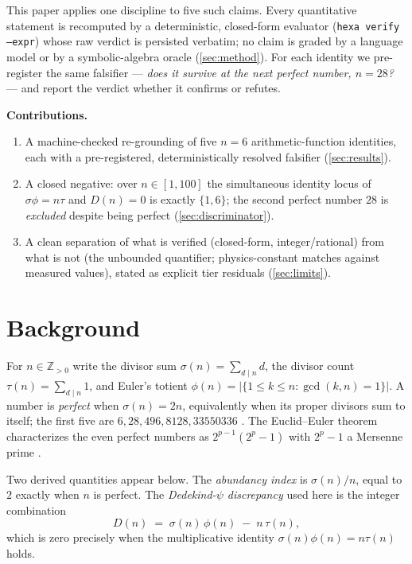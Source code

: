 \documentclass[11pt,a4paper]{article}
\newcommand{\sig}{\sigma}
\theoremstyle{definition}
\begin{document}
This paper applies one discipline to five such claims. Every quantitative
statement is recomputed by a deterministic, closed-form evaluator
(\texttt{hexa verify --expr}) whose raw verdict is persisted verbatim; no claim
is graded by a language model or by a symbolic-algebra oracle
(\textsection\ref{sec:method}). For each identity we pre-register the same
falsifier --- \emph{does it survive at the next perfect number, $n=28$?} --- and
report the verdict whether it confirms or refutes.

\medskip
\noindent\textbf{Contributions.}
\begin{enumerate}\itemsep0.3em
\item A machine-checked re-grounding of five $n=6$ arithmetic-function
identities, each with a pre-registered, deterministically resolved falsifier
(\textsection\ref{sec:results}).
\item A closed negative: over $n\in[1,100]$ the simultaneous identity locus of
$\sig\phi=n\tau$ and $D(n)=0$ is exactly $\{1,6\}$; the second perfect number
$28$ is \emph{excluded} despite being perfect
(\textsection\ref{sec:discriminator}).
\item A clean separation of what is verified (closed-form, integer/rational)
from what is not (the unbounded quantifier; physics-constant matches against
measured values), stated as explicit tier residuals
(\textsection\ref{sec:limits}).
\end{enumerate}

\section{Background}
\label{sec:bg}

For $n\in\mathbb{Z}_{>0}$ write the divisor sum $\sig(n)=\sum_{d\mid n} d$, the
divisor count $\tau(n)=\sum_{d\mid n} 1$, and Euler's totient
$\phi(n)=|\{1\le k\le n:\gcd(k,n)=1\}|$. A number is \emph{perfect} when
$\sig(n)=2n$, equivalently when its proper divisors sum to itself; the first
five are $6,28,496,8128,33550336$ \citep{oeisA000396}. The Euclid--Euler
theorem characterizes the even perfect numbers as $2^{p-1}(2^p-1)$ with
$2^p-1$ a Mersenne prime \citep{euclid}.

Two derived quantities appear below. The \emph{abundancy index} is
$\sig(n)/n$, equal to $2$ exactly when $n$ is perfect. The
\emph{Dedekind-$\psi$ discrepancy} used here is the integer combination
\begin{equation}
\label{eq:D}
D(n)\;=\;\sig(n)\,\phi(n)\;-\;n\,\tau(n),
\end{equation}
which is zero precisely when the multiplicative identity
$\sig(n)\phi(n)=n\tau(n)$ holds.
\end{document}
